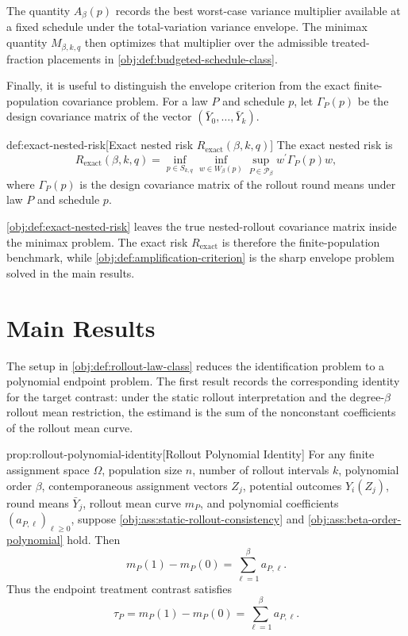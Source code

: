 \documentclass[11pt]{article}
\begin{document}
The quantity \(A_\beta(p)\) records the best worst-case variance multiplier available at a fixed schedule under the total-variation variance envelope. The minimax quantity \(M_{\beta,k,q}\) then optimizes that multiplier over the admissible treated-fraction placements in \cref{obj:def:budgeted-schedule-class}.

Finally, it is useful to distinguish the envelope criterion from the exact finite-population covariance problem. For a law \(P\) and schedule \(p\), let \(\Gamma_P(p)\) be the design covariance matrix of the vector \((\bar Y_0,\ldots,\bar Y_k)\).

\begin{definitionv}{def:exact-nested-risk}[Exact nested risk \(R_{\mathrm{exact}}(\beta,k,q)\)]
The exact nested risk is
\[
R_{\mathrm{exact}}(\beta,k,q)
=
\inf_{p\in S_{k,q}}
\inf_{w\in W_\beta(p)}
\sup_{P\in\mathcal P_\beta}
w^\prime \Gamma_P(p) w,
\]
where \(\Gamma_P(p)\) is the design covariance matrix of the rollout round means under law \(P\) and schedule \(p\).
\end{definitionv}

\cref{obj:def:exact-nested-risk} leaves the true nested-rollout covariance matrix inside the minimax problem. The exact risk \(R_{\mathrm{exact}}\) is therefore the finite-population benchmark, while \cref{obj:def:amplification-criterion} is the sharp envelope problem solved in the main results.


\section{Main Results}

The setup in \cref{obj:def:rollout-law-class} reduces the identification problem to a polynomial endpoint problem. The first result records the corresponding identity for the target contrast: under the static rollout interpretation and the degree-\(\beta\) rollout mean restriction, the estimand is the sum of the nonconstant coefficients of the rollout mean curve.

\begin{lemmav}{prop:rollout-polynomial-identity}[Rollout Polynomial Identity]
For any finite assignment space $\Omega$, population size $n$, number of rollout intervals $k$, polynomial order $\beta$, contemporaneous assignment vectors $Z_j$, potential outcomes $Y_i(Z_j)$, round means $\bar Y_j$, rollout mean curve $m_P$, and polynomial coefficients $(a_{P,\ell})_{\ell\ge 0}$, suppose \cref{obj:ass:static-rollout-consistency} and \cref{obj:ass:beta-order-polynomial} hold. Then
\[
m_P(1)-m_P(0)=\sum_{\ell=1}^{\beta} a_{P,\ell}.
\]
Thus the endpoint treatment contrast satisfies
\[
\tau_P=m_P(1)-m_P(0)=\sum_{\ell=1}^{\beta} a_{P,\ell}.
\]
\end{lemmav}
\end{document}
